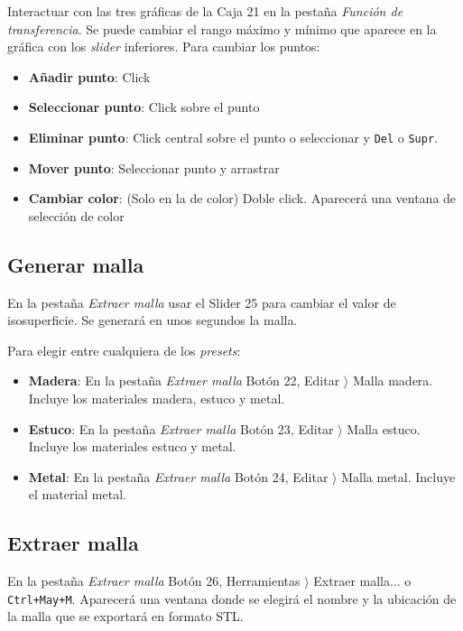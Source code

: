 Interactuar con las tres gráficas de la Caja 21 en la pestaña \textit{Función de transferencia}. Se puede cambiar el rango máximo y mínimo que aparece en la gráfica con los \textit{slider} inferiores. Para cambiar los puntos: 

\begin{itemize}
	\item \textbf{Añadir punto}: Click
	\item \textbf{Seleccionar punto}: Click sobre el punto
	\item \textbf{Eliminar punto}: Click central sobre el punto o seleccionar y \texttt{Del} o \texttt{Supr}.
	\item \textbf{Mover punto}: Seleccionar punto y arrastrar
	\item \textbf{Cambiar color}: (Solo en la de color) Doble click. Aparecerá una ventana de selección de color
\end{itemize}

\subsection{Generar malla}

En la pestaña \textit{Extraer malla} usar el Slider 25 para cambiar el valor de isosuperficie. Se generará en unos segundos la malla.

Para elegir entre cualquiera de los \textit{presets}:

\begin{itemize}
	\item \textbf{Madera}: En la pestaña \textit{Extraer malla} Botón 22, Editar $ \rangle $ Malla madera. Incluye los materiales madera, estuco y metal.
	\item \textbf{Estuco}: En la pestaña \textit{Extraer malla} Botón 23, Editar $ \rangle $ Malla estuco. Incluye los materiales estuco y metal.
	\item \textbf{Metal}: En la pestaña \textit{Extraer malla} Botón 24, Editar $ \rangle $ Malla metal. Incluye el material metal.
\end{itemize}

\subsection{Extraer malla}

En la pestaña \textit{Extraer malla} Botón 26, Herramientas $ \rangle $ Extraer malla... o \texttt{Ctrl+May+M}. Aparecerá una ventana donde se elegirá el nombre y la ubicación de la malla que se exportará en formato STL.

